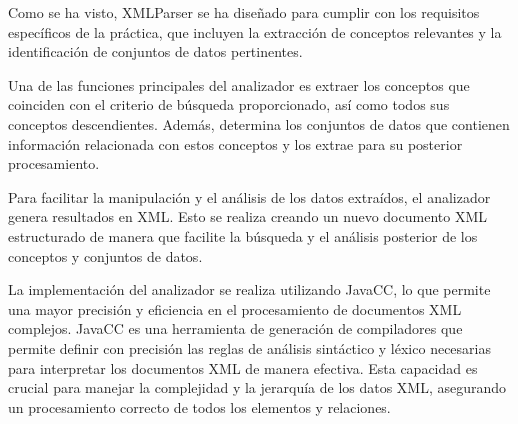 


Como se ha visto, XMLParser se ha diseñado para cumplir con los requisitos específicos de la práctica, que incluyen la extracción de conceptos relevantes y la identificación de conjuntos de datos pertinentes.

Una de las funciones principales del analizador es extraer los conceptos que coinciden con el criterio de búsqueda proporcionado, así como todos sus conceptos descendientes. Además, determina los conjuntos de datos que contienen información relacionada con estos conceptos y los extrae para su posterior procesamiento.

Para facilitar la manipulación y el análisis de los datos extraídos, el analizador genera resultados en XML. Esto se realiza creando un nuevo documento XML estructurado de manera que facilite la búsqueda y el análisis posterior de los conceptos y conjuntos de datos.

La implementación del analizador se realiza utilizando JavaCC, lo que permite una mayor precisión y eficiencia en el procesamiento de documentos XML complejos. JavaCC es una herramienta de generación de compiladores que permite definir con precisión las reglas de análisis sintáctico y léxico necesarias para interpretar los documentos XML de manera efectiva. Esta capacidad es crucial para manejar la complejidad y la jerarquía de los datos XML, asegurando un procesamiento correcto de todos los elementos y relaciones.

